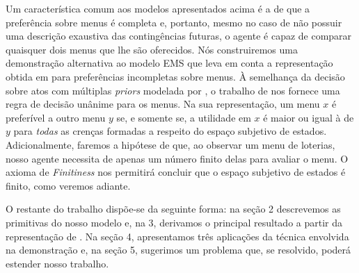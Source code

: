 \documentclass[12pt, a4paper]{article}
\theoremstyle{nonumberplain}
\theoremstyle{plain}
\theoremstyle{plain}
\theoremstyle{plain}
\theoremstyle{nonumberplain}
\begin{document}
Um característica comum aos modelos apresentados acima é a de que a preferência sobre menus é completa e, portanto, mesmo no caso de não possuir uma descrição exaustiva das contingências futuras, o agente é capaz de comparar quaisquer dois menus que lhe são oferecidos. Nós construiremos uma demonstração alternativa ao modelo EMS que leva em conta a representação obtida em \cite{Kochov2007} para preferências incompletas sobre menus. À semelhança da decisão sobre atos com múltiplas \emph{priors} modelada por \cite{Gilboa2010}, o trabalho de \cite{Kochov2007} nos fornece uma regra de decisão unânime para os menus. Na sua representação, um menu $x$ é preferível a outro menu $y$ se, e somente se, a utilidade em $x$ é maior ou igual à de $y$ para \emph{todas} as crenças formadas a respeito do espaço subjetivo de estados. Adicionalmente, faremos a hipótese de que, ao observar um menu de loterias, nosso agente necessita de apenas um número finito delas para avaliar o menu. O axioma de \emph{Finitiness} nos permitirá concluir que o espaço subjetivo de estados é finito, como veremos adiante.

O restante do trabalho dispõe-se da seguinte forma: na seção 2 descrevemos as primitivas do nosso modelo e, na 3, derivamos o principal resultado a partir da representação de \cite{Kochov2007}. Na seção 4, apresentamos três aplicações da técnica envolvida na demonstração e, na seção 5, sugerimos um problema que, se resolvido, poderá estender nosso trabalho.
\end{document}
